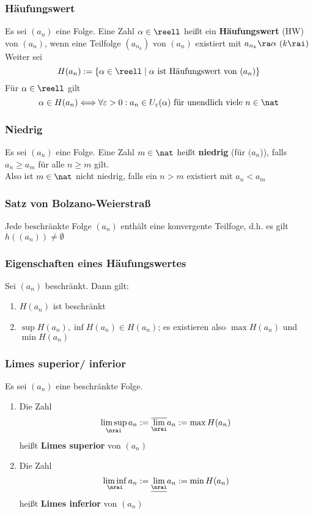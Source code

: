 \documentclass{kit}
\newcommand\f{(a_n)}
\begin{document}
    \subsubsection{Häufungswert}
      Es sei $(a_n)$ eine Folge. Eine Zahl $\alpha\in\reell$ heißt ein \textbf{Häufungswert} (HW) von $(a_n)$, wenn eine Teilfolge $(a_{n_k})$ von $(a_n)$ existiert mit $a_{n_k}\ra\alpha\ (k\rai)$\\
      Weiter sei
      $$H(a_n):=\{\alpha\in\reell\mid\alpha\text{ ist Häufungswert von }(a_n)\}$$
      Für $\alpha\in\reell$ gilt
      $$\alpha\in H(a_n)\Longleftrightarrow\forall\varepsilon>0:a_n\in U_\varepsilon(\alpha)\text{ für unendlich viele }n\in\nat$$
    \subsubsection{Niedrig}
      Es sei $(a_n)$ eine Folge. Eine Zahl $m\in\nat$ heißt \textbf{niedrig} (für $(a_n$)), falls $a_n\ge a_m$ für alle $n\ge m$ gilt.\\
      Also ist $m\in\nat$ nicht niedrig, falls ein $n>m$ existiert mit $a_n<a_m$
    \subsubsection{Satz von Bolzano-Weierstraß}
      Jede beschränkte Folge $\f$ enthält eine konvergente Teilfoge, d.h. es gilt $h(\f)\neq\emptyset$
    \subsubsection{Eigenschaften eines Häufungswertes}
      Sei $\f$ beschränkt. Dann gilt:
      \begin{enumerate}
        \item $H\f$ ist beschränkt
        \item $\sup H\f,\inf H\f\in H\f$; es existieren also $\max H\f$ und $\min H\f$
      \end{enumerate}
    \subsubsection{Limes superior/ inferior}
      Es sei $\f$ eine beschränkte Folge.
      \begin{enumerate}
        \item Die Zahl
          $$\limsup_\nrai a_n:=\overline{\lim_\nrai}a_n:=\max H\f$$
          heißt \textbf{Limes superior} von $\f$
        \item Die Zahl
          $$\liminf_\nrai a_n:=\underline{\lim_\nrai}a_n:=\min H\f$$
          heißt \textbf{Limes inferior} von $\f$
      \end{enumerate}
\end{document}
